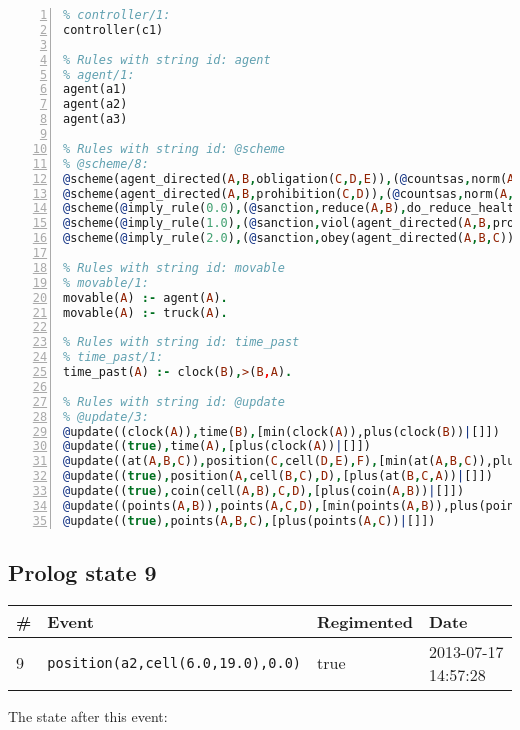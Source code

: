 \documentclass[11pt]{article}\usepackage[utf8]{inputenc}\usepackage{geometry}
\begin{document}
\begin{lstlisting}[language=Prolog, numbers=left]
% Rules with string id: controller
% controller/1:
controller(c1)

% Rules with string id: agent
% agent/1:
agent(a1)
agent(a2)
agent(a3)

% Rules with string id: @scheme
% @scheme/8:
@scheme(agent_directed(A,B,obligation(C,D,E)),(@countsas,norm(A,B,F,obligation(C,D,E)),F),false,(listTrue(C)),(time_past(D)),false,[plus(viol(agent_directed(A,B,obligation(C,D,E))))|[]],[plus(obey(agent_directed(A,B,obligation(C,D,E))))|[]])
@scheme(agent_directed(A,B,prohibition(C,D)),(@countsas,norm(A,B,E,prohibition(C,D)),E),(listTrue(C)),false,(false),false,[plus(viol(agent_directed(A,B,prohibition(C,D))))|[]],[plus(obey(agent_directed(A,B,prohibition(C,D))))|[]])
@scheme(@imply_rule(0.0),(@sanction,reduce(A,B),do_reduce_health(A,B),notifyAgent(A,changed(status))),true,false,false,false,[min(reduce(A,B))|[]],[])
@scheme(@imply_rule(1.0),(@sanction,viol(agent_directed(A,B,prohibition(C,D))),do_sanction(D)),true,false,false,false,[min(viol(agent_directed(A,B,prohibition(C,D))))|[]],[])
@scheme(@imply_rule(2.0),(@sanction,obey(agent_directed(A,B,C))),true,false,false,false,[min(obey(agent_directed(A,B,C)))|[]],[])

% Rules with string id: movable
% movable/1:
movable(A) :- agent(A).
movable(A) :- truck(A).

% Rules with string id: time_past
% time_past/1:
time_past(A) :- clock(B),>(B,A).

% Rules with string id: @update
% @update/3:
@update((clock(A)),time(B),[min(clock(A)),plus(clock(B))|[]])
@update((true),time(A),[plus(clock(A))|[]])
@update((at(A,B,C)),position(C,cell(D,E),F),[min(at(A,B,C)),plus(at(D,E,C))|[]])
@update((true),position(A,cell(B,C),D),[plus(at(B,C,A))|[]])
@update((true),coin(cell(A,B),C,D),[plus(coin(A,B))|[]])
@update((points(A,B)),points(A,C,D),[min(points(A,B)),plus(points(A,D))|[]])
@update((true),points(A,B,C),[plus(points(A,C))|[]])

\end{lstlisting}
\clearpage 
\subsection{Prolog state 9}
\begin{table}[ht]
\centering 
\begin{tabular}{l l l l} 
\textbf{\#} & \textbf{Event} & \textbf{Regimented} & \textbf{Date} \\ [0.5ex] 
\hline
9&\texttt{position(a2,cell(6.0,19.0),0.0)}&true&2013-07-17 14:57:28\\ [1ex] \hline\end{tabular}
\end{table}
The state after this event:
\end{document}
